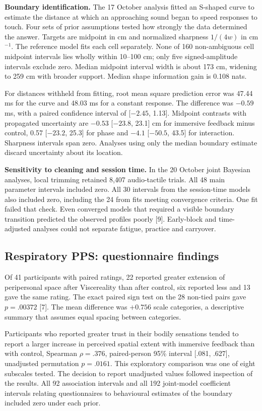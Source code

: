 \textbf{Boundary identification.} The 17 October analysis fitted an S-shaped curve to estimate the distance at which an approaching sound began to speed responses to touch. Four sets of prior assumptions tested how strongly the data determined the answer. Targets are midpoint in cm and normalized sharpness $1/(4w)$ in cm$^{-1}$. The reference model fits each cell separately. None of 160 non-ambiguous cell midpoint intervals lies wholly within 10--100 cm; only five signed-amplitude intervals exclude zero. Median midpoint interval width is about 173 cm, widening to 259 cm with broader support. Median shape information gain is 0.108 nats.

For distances withheld from fitting, root mean square prediction error was 47.44 ms for the curve and 48.03 ms for a constant response. The difference was $-0.59$ ms, with a paired confidence interval of [$-2.45$, 1.13]. Midpoint contrasts with propagated uncertainty are $-0.53$ [$-23.8$, 23.1] cm for immersive feedback minus control, 0.57 [$-23.2$, 25.3] for phase and $-4.1$ [$-50.5$, 43.5] for interaction. Sharpness intervals span zero. Analyses using only the median boundary estimate discard uncertainty about its location.

\textbf{Sensitivity to cleaning and session time.} In the 20 October joint Bayesian analyses, local trimming retained 8,407 audio-tactile trials. All 48 main parameter intervals included zero. All 30 intervals from the session-time models also included zero, including the 24 from fits meeting convergence criteria. One fit failed that check. Even converged models that required a visible boundary transition predicted the observed profiles poorly [9]. Early-block and time-adjusted analyses could not separate fatigue, practice and carryover.

\subsection{Respiratory PPS: questionnaire findings}
\label{sec:pps-questionnaires}
Of 41 participants with paired ratings, 22 reported greater extension of peripersonal space after Viscereality than after control, six reported less and 13 gave the same rating. The exact paired sign test on the 28 non-tied pairs gave $p=.00372$ [7]. The mean difference was $+0.756$ scale categories, a descriptive summary that assumes equal spacing between categories.

Participants who reported greater trust in their bodily sensations tended to report a larger increase in perceived spatial extent with immersive feedback than with control, Spearman $\rho=.376$, paired-person 95\% interval [.081, .627], unadjusted permutation $p=.0161$. This exploratory comparison was one of eight subscales tested. The decision to report unadjusted values followed inspection of the results. All 92 association intervals and all 192 joint-model coefficient intervals relating questionnaires to behavioural estimates of the boundary included zero under each prior.

